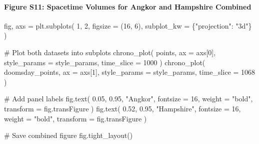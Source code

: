 \documentclass[
  11pt,
  letterpaper,
  DIV=11,
  numbers=noendperiod]{scrartcl}
\let\oldparagraph\paragraph
\renewcommand{\paragraph}[1]{\oldparagraph{#1}\mbox{}}
\newenvironment{Shaded}{\begin{snugshade}}{\end{snugshade}}
\newcommand{\CommentTok}[1]{\textcolor[rgb]{0.37,0.37,0.37}{#1}}
\newcommand{\DecValTok}[1]{\textcolor[rgb]{0.68,0.00,0.00}{#1}}
\newcommand{\FloatTok}[1]{\textcolor[rgb]{0.68,0.00,0.00}{#1}}
\newcommand{\NormalTok}[1]{\textcolor[rgb]{0.00,0.23,0.31}{#1}}
\newcommand{\OperatorTok}[1]{\textcolor[rgb]{0.37,0.37,0.37}{#1}}
\newcommand{\StringTok}[1]{\textcolor[rgb]{0.13,0.47,0.30}{#1}}
\begin{document}
\paragraph{Figure S11: Spacetime Volumes for Angkor and Hampshire
Combined}\label{figure-s11-spacetime-volumes-for-angkor-and-hampshire-combined}

\begin{Shaded}
\begin{Highlighting}[]
\NormalTok{fig, axs }\OperatorTok{=}\NormalTok{ plt.subplots(}
    \DecValTok{1}\NormalTok{, }
    \DecValTok{2}\NormalTok{, }
\NormalTok{    figsize }\OperatorTok{=}\NormalTok{ (}\DecValTok{16}\NormalTok{, }\DecValTok{6}\NormalTok{), }
\NormalTok{    subplot\_kw }\OperatorTok{=}\NormalTok{ \{}\StringTok{"projection"}\NormalTok{: }\StringTok{"3d"}\NormalTok{\}}
\NormalTok{)}

\CommentTok{\# Plot both datasets into subplots}
\NormalTok{chrono\_plot(}
\NormalTok{    points, }
\NormalTok{    ax }\OperatorTok{=}\NormalTok{ axs[}\DecValTok{0}\NormalTok{], }
\NormalTok{    style\_params }\OperatorTok{=}\NormalTok{ style\_params, }
\NormalTok{    time\_slice }\OperatorTok{=} \DecValTok{1000}
\NormalTok{)}
\NormalTok{chrono\_plot(}
\NormalTok{    doomsday\_points, }
\NormalTok{    ax }\OperatorTok{=}\NormalTok{ axs[}\DecValTok{1}\NormalTok{], }
\NormalTok{    style\_params }\OperatorTok{=}\NormalTok{ style\_params, }
\NormalTok{    time\_slice }\OperatorTok{=} \DecValTok{1068}
\NormalTok{)}

\CommentTok{\# Add panel labels}
\NormalTok{fig.text(}
    \FloatTok{0.05}\NormalTok{, }
    \FloatTok{0.95}\NormalTok{, }
    \StringTok{"Angkor"}\NormalTok{, }
\NormalTok{    fontsize }\OperatorTok{=} \DecValTok{16}\NormalTok{, }
\NormalTok{    weight }\OperatorTok{=} \StringTok{"bold"}\NormalTok{, }
\NormalTok{    transform }\OperatorTok{=}\NormalTok{ fig.transFigure}
\NormalTok{)}
\NormalTok{fig.text(}
    \FloatTok{0.52}\NormalTok{, }
    \FloatTok{0.95}\NormalTok{, }
    \StringTok{"Hampshire"}\NormalTok{, }
\NormalTok{    fontsize }\OperatorTok{=} \DecValTok{16}\NormalTok{, }
\NormalTok{    weight }\OperatorTok{=} \StringTok{"bold"}\NormalTok{, }
\NormalTok{    transform }\OperatorTok{=}\NormalTok{ fig.transFigure}
\NormalTok{)}

\CommentTok{\# Save combined figure}
\NormalTok{fig.tight\_layout()}


\end{Highlighting}
\end{Shaded}
\end{document}
